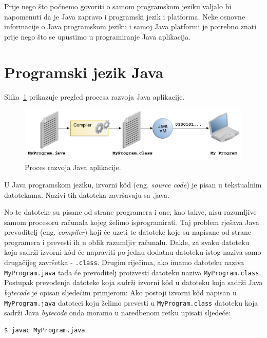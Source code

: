 Prije nego što počnemo govoriti o samom programskom jeziku valjalo bi napomenuti da je Java zapravo i programski jezik i platforma. Neke osnovne informacije o Java programskom jeziku i samoj Java platformi je potrebno znati prije nego što se upustimo u programiranje Java aplikacija.

\section{Programski jezik Java}
Slika~\ref{fig:software-development-process} prikazuje pregled procesa razvoja Java aplikacije.\cite{javatutorials}

\begin{figure}[h!]
    \label{fig:software-development-process}
    \caption{Proces razvoja Java aplikacije.}
    \centering
    \includegraphics[width=\textwidth]{images/software-development-process}
\end{figure}

U Java programskom jeziku, izvorni kôd (eng. \emph{source code}) je pisan u tekstualnim datotekama. Nazivi tih datoteka završavaju sa .java.

No te datoteke su pisane od strane programera i one, kao takve, nisu razumljive samom procesoru računala kojeg želimo isprogramirati. Taj problem rješava Java prevoditelj (eng. \emph{compiler}) koji će uzeti te datoteke koje su napisane od strane programera i prevesti ih u oblik razumljiv računalu. Dakle, za svaku datoteku koja sadrži izvorni kôd će napraviti po jednu dodatnu datoteku istog naziva samo drugačijeg završetka - \texttt{.class}. Drugim riječima, ako imamo datoteku naziva \texttt{MyProgram.java} tada će prevoditelj proizvesti datoteku naziva \texttt{MyProgram.class}. Postupak prevođenja datoteke koja sadrži izvorni kôd u datoteku koja sadrži Java \emph{bytecode} je opisan sljedećim primjerom: Ako postoji izvorni kôd napisan u \texttt{MyProgram.java} datoteci koju želimo prevesti u \texttt{MyProgram.class} datoteku koja sadrži Java \emph{bytecode} onda moramo u naredbenom retku upisati sljedeće:

\begin{lstlisting}
$ javac MyProgram.java
\end{lstlisting}

